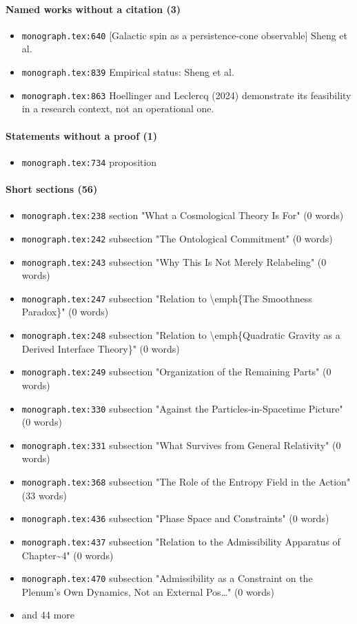 \documentclass[11pt]{article}
\newcommand{\loc}[1]{{\small\color{muted}\texttt{#1}}}
\begin{document}
\paragraph{Named works without a citation (3)}
\begin{itemize}
\item \loc{monograph.tex:640} [Galactic spin as a persistence-cone observable] Sheng et al.
\item \loc{monograph.tex:839} Empirical status: Sheng et al.
\item \loc{monograph.tex:863} Hoellinger and Leclercq (2024) demonstrate its feasibility in a research context, not an operational one.
\end{itemize}
\paragraph{Statements without a proof (1)}
\begin{itemize}
\item \loc{monograph.tex:734} proposition
\end{itemize}
\paragraph{Short sections (56)}
\begin{itemize}
\item \loc{monograph.tex:238} section "What a Cosmological Theory Is For" (0 words)
\item \loc{monograph.tex:242} subsection "The Ontological Commitment" (0 words)
\item \loc{monograph.tex:243} subsection "Why This Is Not Merely Relabeling" (0 words)
\item \loc{monograph.tex:247} subsection "Relation to \textbackslash{}emph\{The Smoothness Paradox\}" (0 words)
\item \loc{monograph.tex:248} subsection "Relation to \textbackslash{}emph\{Quadratic Gravity as a Derived Interface Theory\}" (0 words)
\item \loc{monograph.tex:249} subsection "Organization of the Remaining Parts" (0 words)
\item \loc{monograph.tex:330} subsection "Against the Particles-in-Spacetime Picture" (0 words)
\item \loc{monograph.tex:331} subsection "What Survives from General Relativity" (0 words)
\item \loc{monograph.tex:368} subsection "The Role of the Entropy Field in the Action" (33 words)
\item \loc{monograph.tex:436} subsection "Phase Space and Constraints" (0 words)
\item \loc{monograph.tex:437} subsection "Relation to the Admissibility Apparatus of Chapter\textasciitilde{}4" (0 words)
\item \loc{monograph.tex:470} subsection "Admissibility as a Constraint on the Plenum's Own Dynamics, Not an External Pos\ldots{}" (0 words)
\item[] {\color{muted}\small and 44 more}
\end{itemize}
\end{document}
